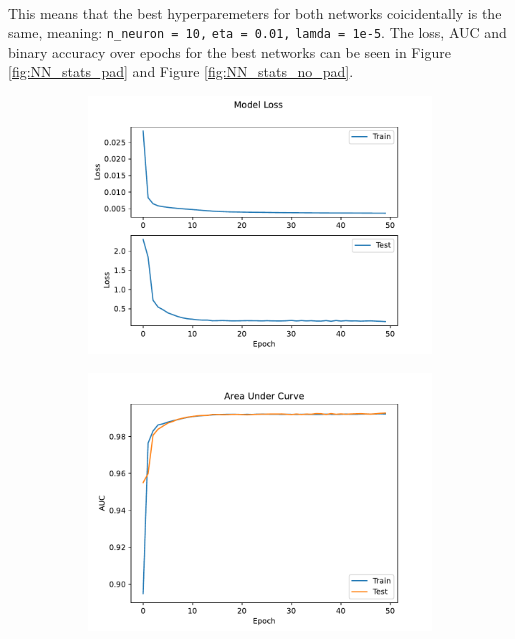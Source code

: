 \documentclass[12pt, a4paper]{book}
\begin{document}
\\This means that the best hyperparemeters for both networks coicidentally is the same, meaning: \verb|n_neuron = 10,| \verb|eta = 0.01,| \verb|lamda = 1e-5|. The loss, AUC and binary accuracy over epochs for the best networks can be seen in Figure \ref{fig:NN_stats_pad} and Figure \ref{fig:NN_stats_no_pad}.
\begin{figure}[!ht]
	\centering
	\begin{subfigure}[b]{0.49\textwidth}
      \centering
      \includegraphics[width=1\textwidth]{New_pad/Loss.pdf}
   \end{subfigure}
   \hfill
	\begin{subfigure}[b]{0.49\textwidth}
      \centering
      \includegraphics[width=1\textwidth]{New_pad/AUC.pdf}

\end{subfigure}
\end{figure}
\end{document}
